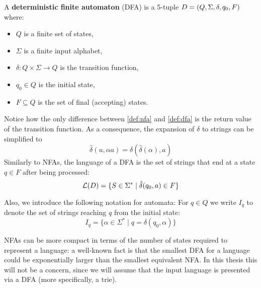 \begin{definition} \label{def:dfa}
    A \textbf{deterministic finite automaton} (DFA) is a 5-tuple $D = (Q, \Sigma, \delta, q_0, F)$ where:
    \begin{itemize}
        \item $Q$ is a finite set of states,
        \item $\Sigma$ is a finite input alphabet,
        \item $\delta: Q \times \Sigma \rightarrow Q$ is the transition function,
        \item $q_0 \in Q$ is the initial state,
        \item $F \subseteq Q$ is the set of final (accepting) states.
    \end{itemize}
\end{definition}
Notice how the only difference between \cref{def:nfa} and \cref{def:dfa} is the return value of the transition function.
As a consequence, the expansion of $\delta$ to strings can be simplified to 
\[
    \hat\delta(u, \alpha a) = \delta(\hat\delta(\alpha), a)
\]
Similarly to NFAs, the language of a DFA is the set of strings that end at a state $q \in F$ after being processed:
\[
    \mathcal{L}(D) = \{S \in \Sigma^* \mid \hat\delta(q_0, a) \in F\}
\]

Also, we introduce the following notation for automata: For \( q \in Q \) we write \( I_q \) to denote the set of strings reaching \( q \) from the initial state:
\[
I_q = \{ \alpha \in \Sigma^* \mid q = \delta(q_0, \alpha) \}
\]

NFAs can be more compact in terms of the number of states required to represent a language: a well-known fact is that the smallest DFA for a language could be exponentially larger than the smallest equivalent NFA. In this thesis this will not be a concern, since we will assume that the input language is presented via a DFA (more specifically, a trie). 


